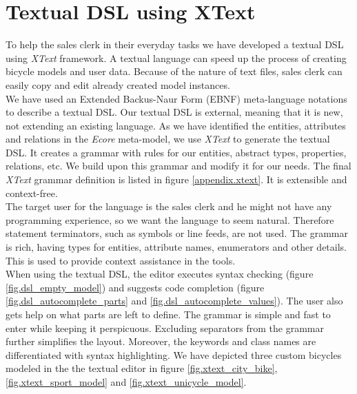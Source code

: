 \section{Textual DSL using XText}
\label{sec.xtext}
\noindent To help the sales clerk in their everyday tasks we have developed a
textual DSL using \emph{XText} framework. A textual language can speed up the process of
creating bicycle models and user data. Because of the nature of text files,
sales clerk can easily copy and edit already created model instances.\\

\noindent We have used an Extended Backus-Naur Form (EBNF)
meta-language notations to describe a textual DSL. Our textual DSL is external,
meaning that it is new, not extending an existing language. As we have
identified the entities, attributes and relations in the \emph{Ecore} meta-model, we use
\emph{XText} to generate the textual DSL. It creates a grammar with rules for
our entities, abstract types, properties, relations, etc. We build upon this
grammar and modify it for our needs. The final \emph{XText} grammar definition
is listed in figure \ref{appendix.xtext}. It is extensible and context-free.\\

\noindent The target user for the language is the sales clerk and he might not
have any programming experience, so we want the language to seem
natural. Therefore statement terminators, such as symbols or line feeds, are not
used. The grammar is rich, having types for entities, attribute
names, enumerators and other details. This is used to provide context assistance
in the tools.\\

\noindent When using the textual DSL, the editor executes syntax checking
(figure \ref{fig.dsl_empty_model}) and suggests code completion (figure
\ref{fig.dsl_autocomplete_parts} and \ref{fig.dsl_autocomplete_values}). The
user also gets help on what parts are left to define. The grammar is simple and
fast to enter while keeping it perspicuous. Excluding separators from the
grammar further simplifies the layout. Moreover, the keywords and class names
are differentiated with syntax highlighting. We have depicted three custom
bicycles modeled in the the textual editor in figure \ref{fig.xtext_city_bike},
\ref{fig.xtext_sport_model} and \ref{fig.xtext_unicycle_model}.